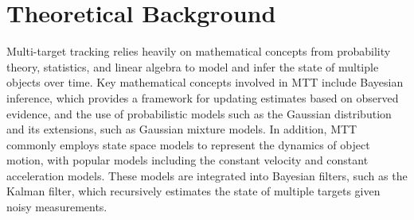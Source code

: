 \chapter{Theoretical Background}
Multi-target tracking relies heavily on mathematical concepts from probability theory, statistics, and linear algebra to model and infer the state of multiple objects over time. Key mathematical concepts involved in MTT include Bayesian inference, which provides a framework for updating estimates based on observed evidence, and the use of probabilistic models such as the Gaussian distribution and its extensions, such as Gaussian mixture models. In addition, MTT commonly employs state space models to represent the dynamics of object motion, with popular models including the constant velocity and constant acceleration models. These models are integrated into Bayesian filters, such as the Kalman filter, which recursively estimates the state of multiple targets given noisy measurements. 
